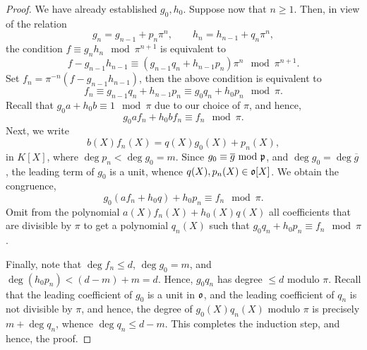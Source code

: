 \begin{proof}
    We have already established $g_0, h_0$. Suppose now that $n\ge 1$. Then, in view of the relation 
    \begin{equation*}
        g_n = g_{n - 1} + p_n\pi^n,\qquad h_n = h_{n - 1} + q_n\pi^n, 
    \end{equation*}
    the condition $f\equiv g_nh_n\mod\pi^{n + 1}$ is equivalent to 
    \begin{equation*}
        f - g_{n - 1}h_{n - 1}\equiv\left(g_{n - 1}q_n + h_{n - 1}p_n\right)\pi^n\mod\pi^{n + 1}.
    \end{equation*}
    Set $f_n = \pi^{-n}\left(f - g_{n - 1}h_{n - 1}\right)$, then the above condition is equivalent to 
    \begin{equation*}
        f_n\equiv g_{n - 1}q_n + h_{n - 1}p_n\equiv g_0q_n + h_0p_n\mod\pi.
    \end{equation*}
    Recall that $g_0 a + h_0b\equiv 1\mod\pi$ due to our choice of $\pi$, and hence, 
    \begin{equation*}
        g_0af_n + h_0bf_n\equiv f_n\mod\pi.
    \end{equation*}
    Next, we write 
    \begin{equation*}
        b(X)f_n(X) = q(X)g_0(X) + p_n(X),
    \end{equation*}
    in $K[X]$, where $\deg p_n < \deg g_0 = m$. Since $g_0\equiv\overline g~\mathrm{mod}~\mathfrak{p}$, and $\deg g_0 = \deg\overline g$, the leading term of $g_0$ is a unit, whence $q(X), p_n(X)\in\mathfrak{o}[X]$. We obtain the congruence, 
    \begin{equation*}
        g_0(af_n + h_0q) + h_0p_n\equiv f_n\mod\pi.
    \end{equation*}
    Omit from the polynomial $a(X)f_n(X) + h_0(X)q(X)$ all coefficients that are divisible by $\pi$ to get a polynomial $q_n(X)$ such that $g_0q_n + h_0 p_n\equiv f_n\mod \pi$.

    Finally, note that $\deg f_n\le d$, $\deg g_0 = m$, and $\deg(h_0p_n) < (d - m) + m = d$. Hence, $g_0q_n$ has degree $\le d$ modulo $\pi$. Recall that the leading coefficient of $g_0$ is a unit in $\mathfrak{o}$, and the leading coefficient of $q_n$ is not divisible by $\pi$, and hence, the degree of $g_0(X)q_n(X)$ modulo $\pi$ is precisely $m + \deg q_n$, whence $\deg q_n\le d - m$. This completes the induction step, and hence, the proof.
\end{proof}

